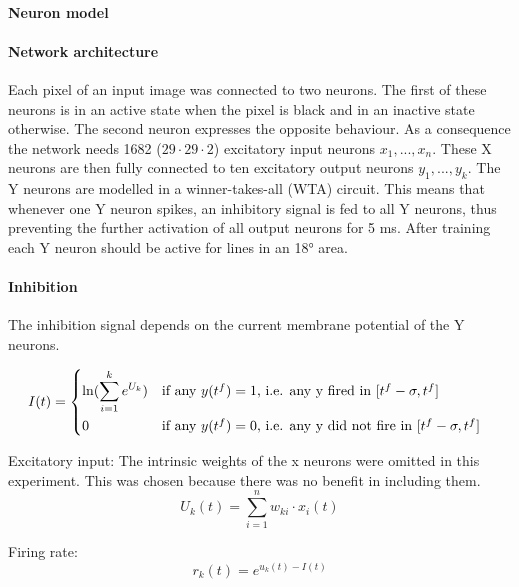 \paragraph{Neuron model}

\paragraph{Network architecture}
Each pixel of an input image was connected to two neurons. The first of these neurons is in an active state when the pixel is black and in an inactive state otherwise. The second neuron expresses the opposite behaviour. As a consequence the network needs 1682 ($29 \cdot 29 \cdot 2$) excitatory input neurons $x_1,...,x_n$. These X neurons are then fully connected to ten excitatory output neurons $y_1,...,y_k$. The Y neurons are modelled in a winner-takes-all (WTA) circuit. This means that whenever one Y neuron spikes, an inhibitory signal is fed to all Y neurons, thus preventing the further activation of all output neurons for 5 ms. After training each Y neuron should be active for lines in an 18° area. 


\paragraph{Inhibition}
The inhibition signal depends on the current membrane potential of the Y neurons.


\begin{equation}
\label{eqn:iinh}
I(t) = \begin{dcases*} \ln ( \sum_{i=1}^k e^{U_k} ) & if any $y(t^f) = 1$, i.e. any y fired in $ [t^f - \sigma, t^f] $ \\
0 & \text{if any $ y(t^f) = 0 $, i.e. any y did not fire in $ [t^f - \sigma, t^f] $ } \end{dcases*}\end{equation}




Excitatory input:
The intrinsic weights of the x neurons were omitted in this experiment. This was chosen because there was no benefit in including them.
\begin{equation}
\label{eqn:uk}
U_k(t) = \sum_{i=1}^n w_{ki} \cdot x_i(t)
\end{equation}

Firing rate:
\begin{equation}
\label{eqn:rk}
r_k(t) = e^{u_k(t) - I(t)}
\end{equation}

